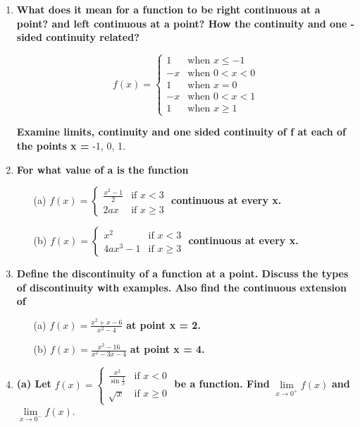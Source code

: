 \documentclass{article}
\begin{document}
\begin{enumerate}
\item \textbf{What does it mean for a function to be right continuous at a point? and left continuous at a point? How the continuity and one - sided continuity related?}

\[f(x) =
\begin{cases}
1 & \text{when } x \leq -1 \\
-x & \text{when } 0 < x < 0 \\
1 & \text{when } x = 0 \\
-x & \text{when } 0 < x < 1 \\
1 & \text{when } x \geq 1
\end{cases}\]

\textbf{Examine limits, continuity and one sided continuity of f at each of the points x =} -1, 0, 1.

\item \textbf{For what value of a is the function}
\begin{enumerate}
    \item[(a)] $f(x) = 
    \begin{cases}
        \frac{x^2 - 1}{2} & \text{if } x < 3 \\
        2ax & \text{if } x \geq 3
    \end{cases}$ \textbf{continuous at every x.}
    \item[(b)] $f(x) = 
    \begin{cases}
        x^2 & \text{if } x < 3 \\
        4ax^3 - 1 & \text{if } x \geq 3
    \end{cases}$ \textbf{continuous at every x.}
\end{enumerate}

\item \textbf{Define the discontinuity of a function at a point. Discuss the types of discontinuity with examples. Also find the continuous extension of}
\begin{enumerate}
    \item[(a)] $f(x) = \frac{x^2 + x - 6}{x^2 - 4}$ \textbf{at point x = 2.}
    \item[(b)] $f(x) = \frac{x^2 - 16}{x^2 - 3x - 4}$ \textbf{at point x = 4.}
\end{enumerate}
 \item \textbf{(a) Let } $f(x) = 
\begin{cases}
    \frac{x^2}{\sin \frac{1}{x}} & \text{if } x < 0 \\
    \sqrt{x} & \text{if } x \geq 0
\end{cases}$ \textbf{be a function. Find } $\lim\limits_{x \to 0^+} f(x)$ \textbf{and } $\lim\limits_{x \to 0^-} f(x)$.


\end{enumerate}
\end{document}
